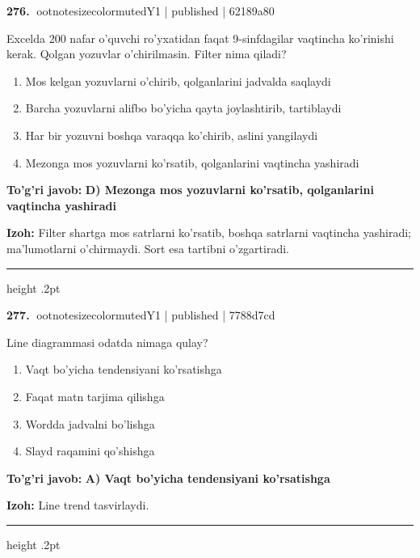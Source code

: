\documentclass[10pt,a4paper]{article}
\begin{document}
\textbf{\color{ink}276.} {ootnotesizecolor{muted}Y1 | published | 62189a80}
\par
Excelda 200 nafar o'quvchi ro'yxatidan faqat 9-sinfdagilar vaqtincha ko'rinishi kerak. Qolgan yozuvlar o'chirilmasin. Filter nima qiladi?
\begin{enumerate}[label=\Alph*),leftmargin=9mm]
\item Mos kelgan yozuvlarni o'chirib, qolganlarini jadvalda saqlaydi
\item Barcha yozuvlarni alifbo bo'yicha qayta joylashtirib, tartiblaydi
\item Har bir yozuvni boshqa varaqqa ko'chirib, aslini yangilaydi
\item Mezonga mos yozuvlarni ko'rsatib, qolganlarini vaqtincha yashiradi
\end{enumerate}
\begin{tcolorbox}[enhanced,breakable,colback=teal!4,colframe=teal!55!black,boxrule=0.45pt,arc=1.2mm,left=2.8mm,right=2.8mm,top=2mm,bottom=2mm]
\textbf{\color{teal}To'g'ri javob:} \textbf{D) Mezonga mos yozuvlarni ko'rsatib, qolganlarini vaqtincha yashiradi}
\par\smallskip
\textbf{Izoh:} Filter shartga mos satrlarni ko'rsatib, boshqa satrlarni vaqtincha yashiradi; ma'lumotlarni o'chirmaydi. Sort esa tartibni o'zgartiradi.
\end{tcolorbox}
\vspace{2mm}\hrule height .2pt\vspace{2mm}

\textbf{\color{ink}277.} {ootnotesizecolor{muted}Y1 | published | 7788d7cd}
\par
Line diagrammasi odatda nimaga qulay?
\begin{enumerate}[label=\Alph*),leftmargin=9mm]
\item Vaqt bo'yicha tendensiyani ko'rsatishga
\item Faqat matn tarjima qilishga
\item Wordda jadvalni bo'lishga
\item Slayd raqamini qo'shishga
\end{enumerate}
\begin{tcolorbox}[enhanced,breakable,colback=teal!4,colframe=teal!55!black,boxrule=0.45pt,arc=1.2mm,left=2.8mm,right=2.8mm,top=2mm,bottom=2mm]
\textbf{\color{teal}To'g'ri javob:} \textbf{A) Vaqt bo'yicha tendensiyani ko'rsatishga}
\par\smallskip
\textbf{Izoh:} Line trend tasvirlaydi.
\end{tcolorbox}
\vspace{2mm}\hrule height .2pt\vspace{2mm}
\end{document}
